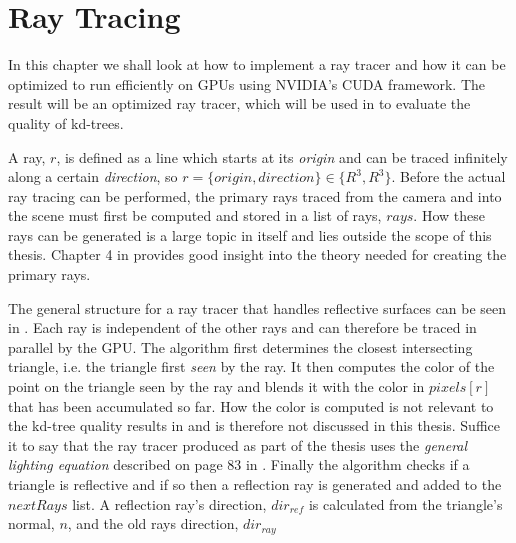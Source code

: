 


\chapter{Ray Tracing}\label{chp:rayTracing}





In this chapter we shall look at how to implement a ray tracer and how it can be
optimized to run efficiently on GPUs using NVIDIA's CUDA framework. The result
will be an optimized ray tracer, which will be used in 
to evaluate the quality of kd-trees.

A ray, $r$, is defined as a line which starts at its \textit{origin} and can be
traced infinitely along a certain \textit{direction}, so $r = \{origin,
direction\} \in \{R^3, R^3\}$. Before the actual ray tracing can be performed,
the primary rays traced from the camera and into the scene must first be
computed and stored in a list of rays, $rays$. How these rays can be generated
is a large topic in itself and lies outside the scope of this thesis. Chapter 4
in  provides good insight into the theory needed for creating the
primary rays.

The general structure for a ray tracer that handles reflective surfaces can be
seen in . Each ray is independent of the other rays
and can therefore be traced in parallel by the GPU. The algorithm first
determines the closest intersecting triangle, i.e. the triangle first
\textit{seen} by the ray. It then computes the color of the point on the
triangle seen by the ray and blends it with the color in $pixels[r]$ that has
been accumulated so far. How the color is computed is not relevant to the
kd-tree quality results in  and is therefore not
discussed in this thesis. Suffice it to say that the ray tracer produced as part
of the thesis uses the \textit{general lighting equation} described on page 83
in . Finally the algorithm checks if a triangle is reflective and
if so then a reflection ray is generated and added to the $nextRays$ list. A
reflection ray's direction, $dir_{ref}$ is calculated from the triangle's
normal, $n$, and the old rays direction, $dir_{ray}$

